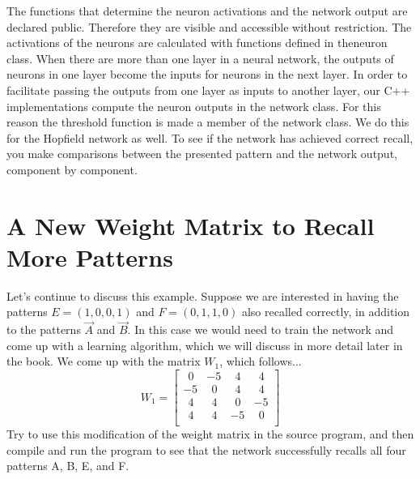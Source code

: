 \documentclass[12pt, right open]{memoir}
\newcommand{\matplus}{
~~
  }
\begin{document}
The functions that determine the neuron activations and the network output are
declared public. Therefore they are visible and accessible without restriction.
The activations of the neurons are calculated with functions defined in theneuron class. When there are more than one layer in a neural network, the
outputs of neurons in one layer become the inputs for neurons in the next
layer. In order to facilitate passing the outputs from one layer as inputs to
another layer, our C++ implementations compute the neuron outputs in the
network class. For this reason the threshold function is made a member of the
network class. We do this for the Hopfield network as well. To see if the
network has achieved correct recall, you make comparisons between the
presented pattern and the network output, component by component.

\section{A New Weight Matrix to Recall More Patterns}
Let’s continue to discuss this example. Suppose we are interested in having the
patterns $E = (1, 0, 0, 1)$ and $F = (0, 1, 1, 0)$ also recalled correctly, in addition
to the patterns $\vec{A}$ and $\vec{B}$. In this case we would need to train the network and
come up with a learning algorithm, which we will discuss in more detail later
in the book. We come up with the matrix $W_1$, which follows...
\[ 
W_1 = \begin{bmatrix}
 \matplus0 & -5 &  \matplus4 & \matplus4 \\
-5 &  \matplus0 &  \matplus4 & \matplus4 \\
 \matplus4 &  \matplus4 &  \matplus0 & -5 \\
 \matplus4 &  \matplus4 & -5 &  \matplus0 \\
\end{bmatrix}
\]
Try to use this modification of the weight matrix in the source program, and
then compile and run the program to see that the network successfully recalls
all four patterns A, B, E, and F.

\end{document}
